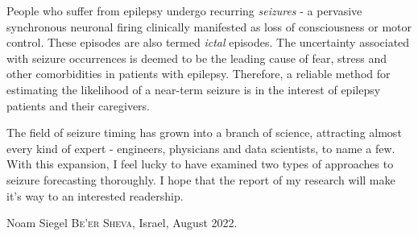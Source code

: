 \documentclass[a4paper, 12pt, \pagelayoutformat, onecolumn, bibliography=totoc]{scrreprt}
\begin{document}


\ifFULL
    
    
    \thispagestyle{empty} %

    \cleardoubleoddemptypage
    
     
    \thispagestyle{empty} %

    \cleardoubleoddemptypage
 
    
    \thispagestyle{empty} %
    
    \cleardoubleoddemptypage
% 
    
%    
    \cleardoubleoddemptypage
    \setPageStyle
    \pagestyle{plain.scrheadings}
    
    
    \cleardoubleoddemptypage
    \setPageStyle
    \pagestyle{plain.scrheadings}
        People who suffer from epilepsy undergo recurring \emph{seizures} - a pervasive synchronous neuronal firing clinically manifested as loss of consciousness or motor control. These episodes are also termed \emph{ictal} episodes. The uncertainty associated with seizure occurrences is deemed to be the leading cause of fear, stress and other comorbidities in patients with epilepsy. Therefore, a reliable method for estimating the likelihood of a near-term seizure is in the interest of epilepsy patients and their caregivers.
        
        The field of seizure timing has grown into a branch of science, attracting almost every kind of expert - engineers, physicians and data scientists, to name a few. With this expansion, I feel lucky to have examined two types of approaches to seizure forecasting thoroughly. I hope that the report of my research will make it's way to an interested readership. 

    \medskip
    \begin {flushright}
      Noam Siegel \textsc {Be'er Sheva}, Israel, August 2022.
    \end {flushright}
\end{document}
